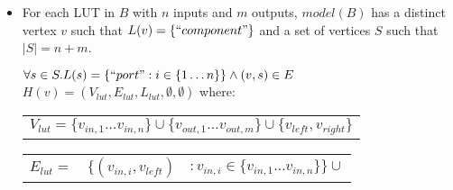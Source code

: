 \begin{defn}
\begin{itemize}
\begin{figure}
\begin{adjustbox}{width=0.8\textwidth}
\end{adjustbox}
\caption{How a 2-wire mux is represented in $model(B)$ (left) in terms of vertex $v$ with $L(v)=``component"$, port vertices and edges, and the $hierarchygraph$ $H(v)$ (right) storing the internal details of the mux. Dashed lines indicate the relation $C$ that links the vertices representing outgoing wires. Vertex labels are shown as text.}
\label{fig:model:mux}
\end{figure}
Lastly, the relation $C$ contains a link from nodes in the FPGA $hierarchygraph$ to nodes in the mux $hierarchygraph$, i.e. $\forall s \in S . \exists w \in V_{mux} . (s, w) \in C$.
The model of a mux is illustrated in Figure \ref{fig:model:mux}.

\item For each LUT in $B$ with $n$ inputs and $m$ outputs, $model(B)$ has a distinct vertex $v$ such that $L(v)=\{``component"\}$ and a set of vertices $S$ such that $|S|=n+m$.

$\forall s \in S. L(s)=\{``port" : i \in \{1 \dots n\}\} \land (v, s) \in E$\\

$H(v) = (V_{lut}, E_{lut}, L_{lut}, \emptyset, \emptyset)$ where:

\begin{tabular}{l}
$V_{lut}=\{v_{in, 1} \dots v_{in, n}\} \cup \{v_{out, 1} \dots v_{out, m}\} \cup \{v_{left}, v_{right}\}$\\
\end{tabular}

\begin{tabular}{lll}
$E_{lut}=$&$\{(v_{in, i}, v_{left})$&$: v_{in, i} \in \{v_{in, 1} \dots v_{in, n}\}\} \cup$\\


\end{tabular}
\end{itemize}
\end{defn}
